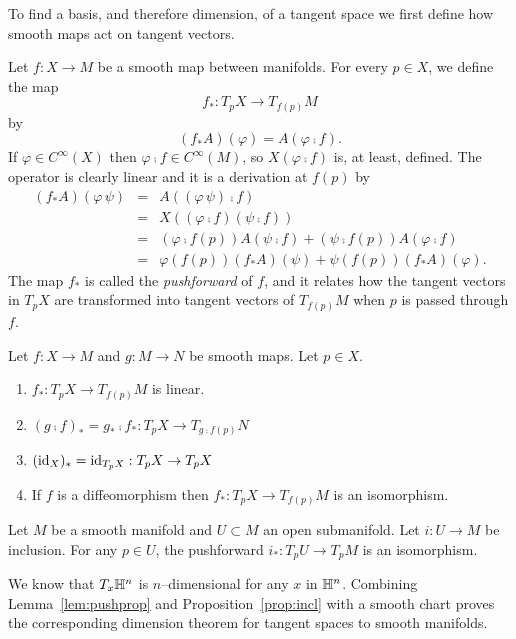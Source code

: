To find a basis, and therefore dimension, of a tangent space we first define how smooth maps act on tangent vectors.

\begin{defn}[Pushforward]
	Let $f:X\to M$ be a smooth map between manifolds.
	For every $p\in X$, we define the map
	\[
		f_*:T_p X\to T_{f(p)} M
	\]
	by
	\[
		(f_*A)(\varphi) = A(\varphi\comp f).
	\]
	If $\varphi\in C^\infty(X)$ then $\varphi\comp f\in C^\infty(M)$, so $X(\varphi\comp f)$ is, at least, defined.
	The operator is clearly linear and it is a derivation at $f(p)$ by
	\[
		\begin{array}{rcl}
			(f_* A)(\varphi\,\psi)&=&A((\varphi\,\psi)\comp f)\\
			&=&X((\varphi\comp f)(\psi\comp f))\\
			&=&(\varphi\comp f(p))A(\psi\comp f) + (\psi\comp f(p))A(\varphi\comp f)\\
			&=&\varphi(f(p))(f_* A)(\psi) + \psi(f(p))(f_* A)(\varphi).
		\end{array}
	\]
	The map $f_*$ is called the \emph{pushforward} of $f$, and it relates how the tangent vectors in $T_p X$ are transformed into tangent vectors of $T_{f(p)}M$ when $p$ is passed through $f$.
\end{defn}

\begin{lem}
	\label{lem:pushprop}
	Let $f:X\to M$ and $g:M\to N$ be smooth maps.  Let $p\in X$.
	\begin{enumerate}
		\item $f_*:T_p X\to T_{f(p)}M$ is linear.
		\item $(g\comp f)_*=g_*\comp f_*:T_p X\to T_{g\comp f(p)}N$
		\item $(\mathrm{id}_X)_*=\mathrm{id}_{T_p X}:T_p X\to T_p X$
		\item If $f$ is a diffeomorphism then $f_*:T_p X\to T_{f(p)}M$ is an isomorphism.
	\end{enumerate}
\end{lem}

\begin{prop}
	\label{prop:incl}
	Let $M$ be a smooth manifold and $U\subset M$ an open submanifold.
	Let $i:U\to M$ be inclusion.
	For any $p\in U$, the pushforward $i_*:T_p U\to T_p M$ is an isomorphism.	
\end{prop}

We know that $T_x \mathbb{H}^n$ is $n$--dimensional for any $x$ in $\mathbb{H}^n$.
Combining Lemma~\ref{lem:pushprop} and Proposition~\ref{prop:incl} with a smooth chart proves the corresponding dimension theorem for tangent spaces to smooth manifolds.

